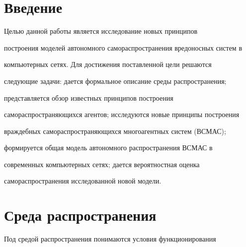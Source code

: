 







      \thispagestyle{headings}





      


            \label{st\stat}


            


            \vspace*{-12pt}





\section{Введение}





     Целью данной работы является исследование новых принципов 


построения моделей автономного самораспространения вредоносных систем в 


компьютерных сетях. Для достижения поставленной цели решаются 


следующие задачи: дается формальное описание среды распространения; 


представляется обзор известных принципов построения 


самораспространяющихся агентов; исследуются новые принципы построения 


враждебных самораспространяющихся многоагентных систем (ВСМАС); 


формируется общая модель автономного распространения ВСМАС в 


современных компьютерных сетях; дается вероятностная оценка 


самораспространения исследованной новой модели.








\section{Среда распространения }





     Под средой распространения понимаются условия функционирования 


